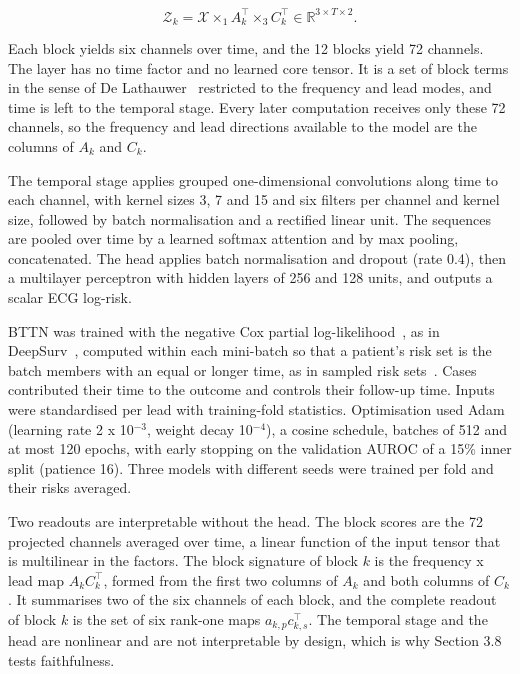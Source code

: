 \documentclass[preprint,12pt]{elsarticle}
\begin{document}
\[\mathcal{Z}_k = \mathcal{X} \times_1 A_k^\top \times_3 C_k^\top \in \mathbb{R}^{3 \times T \times 2}.\]

Each block yields six channels over time, and the 12 blocks yield 72 channels. The layer has no time factor and no learned core tensor. It is a set of block terms in the sense of De Lathauwer~\cite{delathauwer2008} restricted to the frequency and lead modes, and time is left to the temporal stage. Every later computation receives only these 72 channels, so the frequency and lead directions available to the model are the columns of $A_k$ and $C_k$.

The temporal stage applies grouped one-dimensional convolutions along time to each channel, with kernel sizes 3, 7 and 15 and six filters per channel and kernel size, followed by batch normalisation and a rectified linear unit. The sequences are pooled over time by a learned softmax attention and by max pooling, concatenated. The head applies batch normalisation and dropout (rate 0.4), then a multilayer perceptron with hidden layers of 256 and 128 units, and outputs a scalar ECG log-risk.

BTTN was trained with the negative Cox partial log-likelihood~\cite{cox1972}, as in DeepSurv~\cite{katzman2018}, computed within each mini-batch so that a patient's risk set is the batch members with an equal or longer time, as in sampled risk sets~\cite{kvamme2019}. Cases contributed their time to the outcome and controls their follow-up time. Inputs were standardised per lead with training-fold statistics. Optimisation used Adam (learning rate 2 x 10$^{-3}$, weight decay 10$^{-4}$), a cosine schedule, batches of 512 and at most 120 epochs, with early stopping on the validation AUROC of a 15\% inner split (patience 16). Three models with different seeds were trained per fold and their risks averaged.

Two readouts are interpretable without the head. The block scores are the 72 projected channels averaged over time, a linear function of the input tensor that is multilinear in the factors. The block signature of block $k$ is the frequency x lead map $A_k C_k^\top$, formed from the first two columns of $A_k$ and both columns of $C_k$. It summarises two of the six channels of each block, and the complete readout of block $k$ is the set of six rank-one maps $a_{k,p} c_{k,s}^\top$. The temporal stage and the head are nonlinear and are not interpretable by design, which is why Section 3.8 tests faithfulness.
\end{document}
